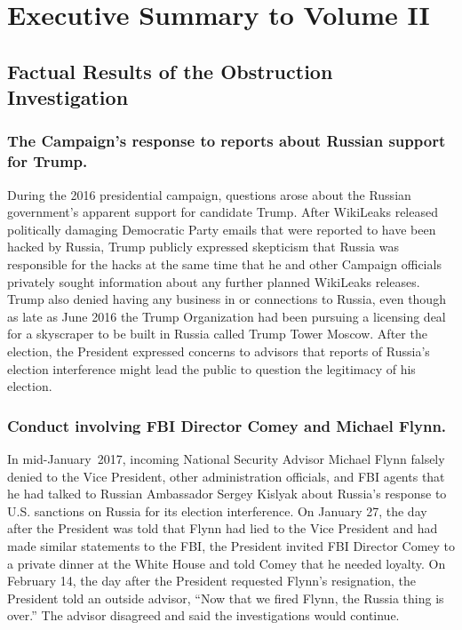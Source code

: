 \section*{Executive Summary to Volume II}
\label{sec:executive-2}

\subsection*{Factual Results of the Obstruction Investigation}

\subsubsection*{The Campaign's response to reports about Russian support for Trump.}

During the 2016 presidential campaign, questions arose about the Russian government's apparent support for candidate Trump.
After WikiLeaks released politically damaging Democratic Party emails that were reported to have been hacked by Russia, Trump publicly expressed skepticism that Russia was responsible for the hacks at the same time that he and other Campaign officials privately sought information about any further planned WikiLeaks releases.
Trump also denied having any business in or connections to Russia, even though as late as June 2016 the Trump Organization had been pursuing a licensing deal for a skyscraper to be built in Russia called Trump Tower Moscow.
After the election, the President expressed concerns to advisors that reports of Russia's election interference might lead the public to question the legitimacy of his election.

\subsubsection*{Conduct involving FBI Director Comey and Michael Flynn.}

In mid-January~2017, incoming National Security Advisor Michael Flynn falsely denied to the Vice President, other administration officials, and FBI agents that he had talked to Russian Ambassador Sergey Kislyak about Russia's response to U.S. sanctions on Russia for its election interference.
On January 27, the day after the President was told that Flynn had lied to the Vice President and had made similar statements to the FBI, the President invited FBI Director Comey to a private dinner at the White House and told Comey that he needed loyalty.
On February 14, the day after the President requested Flynn's resignation, the President told an outside advisor, ``Now that we fired Flynn, the Russia thing is over.''
The advisor disagreed and said the investigations would continue.

